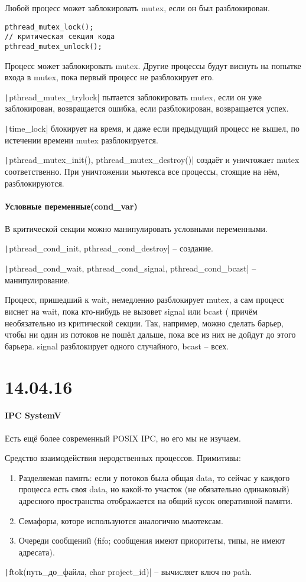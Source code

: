\documentclass[a4paper,10pt]{article}
\newcommand{\ci}{\texttt}
\begin{document}
Любой процесс может заблокировать mutex, если он был разблокирован.

\begin{verbatim}
pthread_mutex_lock();
// критическая секция кода
pthread_mutex_unlock();
\end{verbatim}

Процесс может заблокировать mutex. Другие процессы будут виснуть на попытке входа в mutex, пока первый процесс не разблокирует его.

\ci|pthread_mutex_trylock| пытается заблокировать mutex, если он уже заблокирован, возвращается ошибка, если разблокирован, возвращается успех.

\ci|time_lock| блокирует на время, и даже если предыдущий процесс не вышел, по истечении времени mutex разблокируется.

\ci|pthread_mutex_init(), pthread_mutex_destroy()| создаёт и уничтожает mutex соответственно. При уничтожении мьютекса все процессы, стоящие на нём, разблокируются.

\paragraph{Условные переменные(cond\_var)}
В критической секции можно манипулировать условными переменными.

\ci|pthread_cond_init, pthread_cond_destroy| -- создание.

\ci|pthread_cond_wait, pthread_cond_signal, pthread_cond_bcast| -- манипулирование.

Процесс, пришедший к wait, немедленно разблокирует mutex, а сам процесс виснет на wait, пока кто-нибудь не вызовет signal или bcast ( причём необязательно из критической секции. Так, например, можно сделать барьер, чтобы ни один из потоков не пошёл дальше, пока все из них не дойдут до этого барьера.
signal разблокирует одного случайного, bcast -- всех.

\section{14.04.16}
\paragraph{IPC SystemV}
Есть ещё более современный POSIX IPC, но его мы не изучаем.

Средство взаимодействия неродственных процессов. 
Примитивы:
\begin{enumerate}
\item Разделяемая память: если у потоков была общая data, то сейчас у каждого процесса есть своя data, но какой-то участок (не обязательно одинаковый) адресного пространства отображается на общий кусок оперативной памяти.
\item Семафоры, которе используются аналогично мьютексам.
\item Очереди сообщений (fifo; сообщения имеют приоритеты, типы, не имеют адресата).
\end{enumerate}
\ci|ftok(путь_до_файла, char project_id)| -- вычисляет ключ по path.
\end{document}
